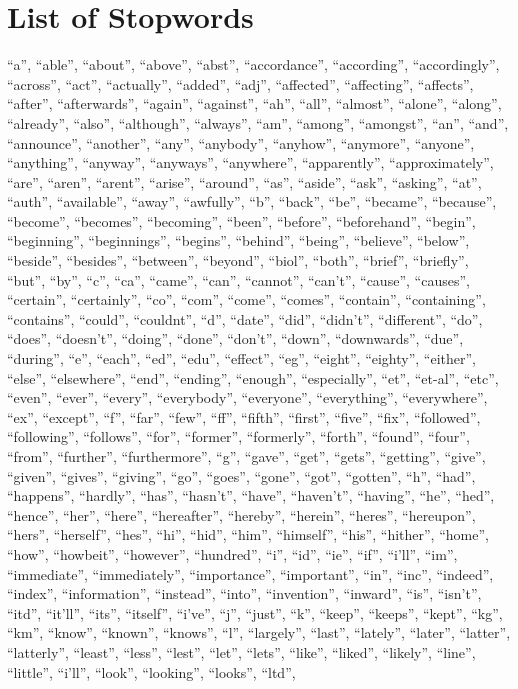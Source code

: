 \documentclass[midd]{thesis}
\begin{document}
\appendix
\chapter{List of Stopwords}
 ``a'', ``able'', ``about'', ``above'', ``abst'', ``accordance'', ``according'', ``accordingly'', ``across'', ``act'', ``actually'', ``added'', ``adj'', ``affected'', ``affecting'', ``affects'', ``after'', ``afterwards'', ``again'', ``against'', ``ah'', ``all'', ``almost'', ``alone'', ``along'', ``already'', ``also'', ``although'', ``always'', ``am'', ``among'', ``amongst'', ``an'', ``and'', ``announce'', ``another'', ``any'', ``anybody'', ``anyhow'', ``anymore'', ``anyone'', ``anything'', ``anyway'', ``anyways'', ``anywhere'', ``apparently'', ``approximately'', ``are'', ``aren'', ``arent'', ``arise'', ``around'', ``as'', ``aside'', ``ask'', ``asking'', ``at'', ``auth'', ``available'', ``away'', ``awfully'', ``b'', ``back'', ``be'', ``became'', ``because'', ``become'', ``becomes'', ``becoming'', ``been'', ``before'', ``beforehand'', ``begin'', ``beginning'', ``beginnings'', ``begins'', ``behind'', ``being'', ``believe'', ``below'', ``beside'', ``besides'', ``between'', ``beyond'', ``biol'', ``both'', ``brief'', ``briefly'', ``but'', ``by'', ``c'', ``ca'', ``came'', ``can'', ``cannot'', ``can't'', ``cause'', ``causes'', ``certain'', ``certainly'', ``co'', ``com'', ``come'', ``comes'', ``contain'', ``containing'', ``contains'', ``could'', ``couldnt'', ``d'', ``date'', ``did'', ``didn't'', ``different'', ``do'', ``does'', ``doesn't'', ``doing'', ``done'', ``don't'', ``down'', ``downwards'', ``due'', ``during'', ``e'', ``each'', ``ed'', ``edu'', ``effect'', ``eg'', ``eight'', ``eighty'', ``either'', ``else'', ``elsewhere'', ``end'', ``ending'', ``enough'', ``especially'', ``et'', ``et-al'', ``etc'', ``even'', ``ever'', ``every'', ``everybody'', ``everyone'', ``everything'', ``everywhere'', ``ex'', ``except'', ``f'', ``far'', ``few'', ``ff'', ``fifth'', ``first'', ``five'', ``fix'', ``followed'', ``following'', ``follows'', ``for'', ``former'', ``formerly'', ``forth'', ``found'', ``four'', ``from'', ``further'', ``furthermore'', ``g'', ``gave'', ``get'', ``gets'', ``getting'', ``give'', ``given'', ``gives'', ``giving'', ``go'', ``goes'', ``gone'', ``got'', ``gotten'', ``h'', ``had'', ``happens'', ``hardly'', ``has'', ``hasn't'', ``have'', ``haven't'', ``having'', ``he'', ``hed'', ``hence'', ``her'', ``here'', ``hereafter'', ``hereby'', ``herein'', ``heres'', ``hereupon'', ``hers'', ``herself'', ``hes'', ``hi'', ``hid'', ``him'', ``himself'', ``his'', ``hither'', ``home'', ``how'', ``howbeit'', ``however'', ``hundred'', ``i'', ``id'', ``ie'', ``if'', ``i'll'', ``im'', ``immediate'', ``immediately'', ``importance'', ``important'', ``in'', ``inc'', ``indeed'', ``index'', ``information'', ``instead'', ``into'', ``invention'', ``inward'', ``is'', ``isn't'', ``itd'', ``it'll'', ``its'', ``itself'', ``i've'', ``j'', ``just'', ``k'', ``keep'', ``keeps'', ``kept'', ``kg'', ``km'', ``know'', ``known'', ``knows'', ``l'', ``largely'', ``last'', ``lately'', ``later'', ``latter'', ``latterly'', ``least'', ``less'', ``lest'', ``let'', ``lets'', ``like'', ``liked'', ``likely'', ``line'', ``little'', ``i'll'', ``look'', ``looking'', ``looks'', ``ltd'', 
\end{document}

